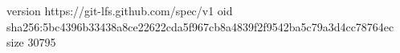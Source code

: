 version https://git-lfs.github.com/spec/v1
oid sha256:5bc4396b33438a8ce22622cda5f967cb8a4839f2f9542ba5c79a3d4cc78764ec
size 30795
